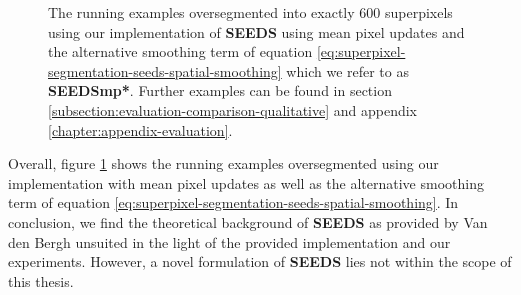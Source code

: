 \begin{figure}[b]
{	}
	\caption[Superpixel segmentations obtained from our implementation of \textbf{SEEDS} \cite{VanDenBerghBoixRoigCapitaniVanGool:2012} using mean pixel updates and the alternative smoothing term of equation \eqref{eq:superpixel-segmentation-seeds-spatial-smoothing}.]{The running examples oversegmented into exactly $600$ superpixels using our implementation of \textbf{SEEDS} using mean pixel updates and the alternative smoothing term of equation \eqref{eq:superpixel-segmentation-seeds-spatial-smoothing} which we refer to as \textbf{SEEDSmp*}. Further examples can be found in section \ref{subsection:evaluation-comparison-qualitative} and appendix \ref{chapter:appendix-evaluation}.}
	\label{fig:superpixel-segmentation-seeds-results}
\end{figure}
Overall, figure \ref{fig:superpixel-segmentation-seeds-results} shows the running examples oversegmented using our implementation with mean pixel updates as well as the alternative smoothing term of equation \eqref{eq:superpixel-segmentation-seeds-spatial-smoothing}. In conclusion, we find the theoretical background of \textbf{SEEDS} as provided by Van den Bergh \etal \cite{VanDenBerghBoixRoigCapitaniVanGool:2012} unsuited in the light of the provided implementation and our experiments. However, a novel formulation of \textbf{SEEDS} lies not within the scope of this thesis.

